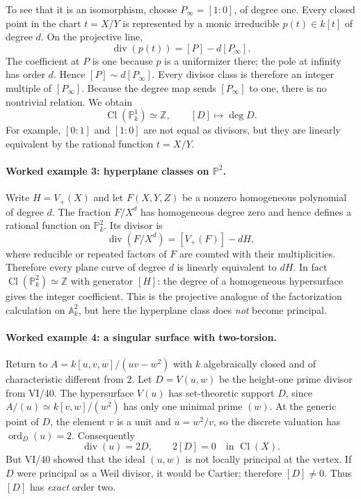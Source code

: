 To see that it is an isomorphism, choose
$P_\infty=[1:0]$, of degree one.  Every closed point in the
chart $t=X/Y$ is represented by a monic irreducible
$p(t)\in k[t]$ of degree $d$.  On the projective line,
\[
 \operatorname{div}(p(t))=[P]-d[P_\infty].
\]
The coefficient at $P$ is one because $p$ is a uniformizer there;
the pole at infinity has order $d$.  Hence
$[P]\sim d[P_\infty]$.  Every divisor class is therefore an
integer multiple of $[P_\infty]$.  Because the degree map sends
$[P_\infty]$ to one, there is no nontrivial relation.  We obtain
\[
 \operatorname{Cl}(\mathbb P_k^1)\simeq\mathbb Z,
 \qquad[D]\longmapsto\deg D.
\]
For example, $[0:1]$ and $[1:0]$ are not equal as divisors, but
they are linearly equivalent by the rational function $t=X/Y$.

\paragraph{Worked example 3: hyperplane classes on $\mathbb P^2$.}
Write $H=V_+(X)$ and let $F(X,Y,Z)$ be a nonzero homogeneous
polynomial of degree $d$.  The fraction $F/X^d$ has homogeneous
degree zero and hence defines a rational function on
$\mathbb P_k^2$.  Its divisor is
\[
 \operatorname{div}(F/X^d)=[V_+(F)]-dH,
\]
where reducible or repeated factors of $F$ are counted with their
multiplicities.  Therefore every plane curve of degree $d$ is
linearly equivalent to $dH$.  In fact
$\operatorname{Cl}(\mathbb P_k^2)\simeq\mathbb Z$ with generator
$[H]$: the degree of a homogeneous hypersurface gives the
integer coefficient.  This is the projective analogue of the
factorization calculation on $\mathbb A_k^2$, but here the
hyperplane class does \emph{not} become principal.

\paragraph{Worked example 4: a singular surface with two-torsion.}
Return to $A=k[u,v,w]/(uv-w^2)$ with $k$ algebraically closed
and of characteristic different from $2$.
Let $D=V(u,w)$ be the height-one prime divisor from VI/40.
The hypersurface $V(u)$ has set-theoretic support $D$, since
$A/(u)\simeq k[v,w]/(w^2)$ has only one minimal prime $(w)$.
At the generic point of $D$, the element $v$ is a unit and
$u=w^2/v$, so the discrete valuation has
$\operatorname{ord}_D(u)=2$.  Consequently
\[
 \operatorname{div}(u)=2D,
 \qquad 2[D]=0\quad\text{in }\operatorname{Cl}(X).
\]
But VI/40 showed that the ideal $(u,w)$ is not locally principal
at the vertex.  If $D$ were principal as a Weil divisor, it would
be Cartier; therefore $[D]\ne0$.  Thus $[D]$ has \emph{exact}
order two.

